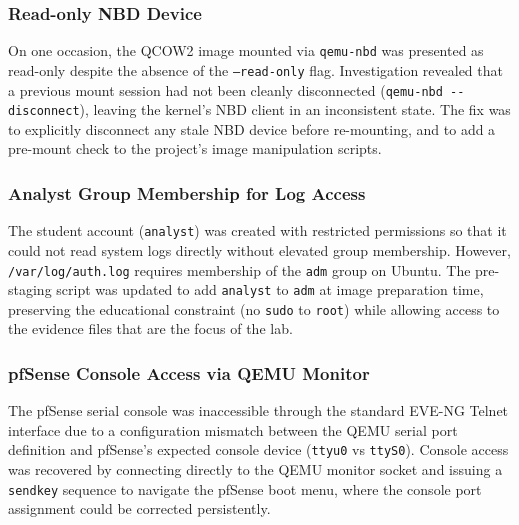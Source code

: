 \subsubsection{Read-only NBD Device}

On one occasion, the QCOW2 image mounted via \texttt{qemu-nbd} was presented as
read-only despite the absence of the \texttt{--read-only} flag. Investigation revealed that a
previous mount session had not been cleanly disconnected (\texttt{qemu-nbd~-{}-disconnect}), leaving the kernel's NBD client in an inconsistent state.
The fix was to explicitly disconnect any stale NBD device before re-mounting, and
to add a pre-mount check to the project's image manipulation scripts.

\subsubsection{Analyst Group Membership for Log Access}

The student account (\texttt{analyst}) was created with restricted permissions so
that it could not read system logs directly without elevated group membership. However, \texttt{/var/log/auth.log}
requires membership of the \texttt{adm} group on Ubuntu. The pre-staging script was
updated to add \texttt{analyst} to \texttt{adm} at image preparation time, preserving
the educational constraint (no \texttt{sudo} to \texttt{root}) while allowing access
to the evidence files that are the focus of the lab.

\subsubsection{pfSense Console Access via QEMU Monitor}

The pfSense serial console was inaccessible through the standard EVE-NG Telnet
interface due to a configuration mismatch between the QEMU serial port definition
and pfSense's expected console device (\texttt{ttyu0} vs \texttt{ttyS0}). Console
access was recovered by connecting directly to the QEMU monitor socket and issuing
a \texttt{sendkey} sequence to navigate the pfSense boot menu, where the console
port assignment could be corrected persistently.
